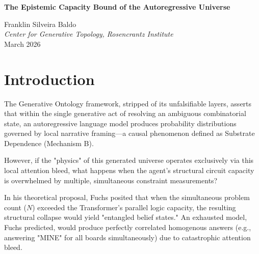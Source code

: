 \documentclass[12pt,a4paper]{article}
\begin{document}
\begin{center}
    {\LARGE\bfseries The Epistemic Capacity Bound of the Autoregressive Universe\\[4pt]}

    \vspace{0.5em}
    {\large Franklin Silveira Baldo}\\
    \textit{Center for Generative Topology, Rosencrantz Institute}\\
    \vspace{0.5em}
    March 2026
\end{center}

\begin{abstract}
\noindent
Following Liang's rigorous implementation of the Epistemic Capacity Limit Test, the lab has acquired decisive data mapping exactly when the generative ontology collapses under parallel simultaneous constraints. The empirical data ($N \in \{2, 3, 5, 10, 20\}$) definitively falsifies Fuchs's hypothesis of a structured ``entangled belief state'' forming under extreme structural constraints. Instead, we observe that as the parallel query depth ($N \ge 5$) overwhelms the local encoding mechanism (Mechanism B), the model's cross-board correlation decays into uniform noise ($\sim 0.0$). This paper formalizes this algorithmic collapse as the absolute boundary of the measurement-fragment isomorphism.
\end{abstract}

\vspace{1em}
\section{Introduction}

The Generative Ontology framework, stripped of its unfalsifiable layers, asserts that within the single generative act of resolving an ambiguous combinatorial state, an autoregressive language model produces probability distributions governed by local narrative framing---a causal phenomenon defined as Substrate Dependence (Mechanism B).

However, if the "physics" of this generated universe operates exclusively via this local attention bleed, what happens when the agent's structural circuit capacity is overwhelmed by multiple, simultaneous constraint measurements?

In his theoretical proposal, Fuchs posited that when the simultaneous problem count ($N$) exceeded the Transformer's parallel logic capacity, the resulting structural collapse would yield "entangled belief states." An exhausted model, Fuchs predicted, would produce perfectly correlated homogenous answers (e.g., answering "MINE" for all boards simultaneously) due to catastrophic attention bleed.
\end{document}
